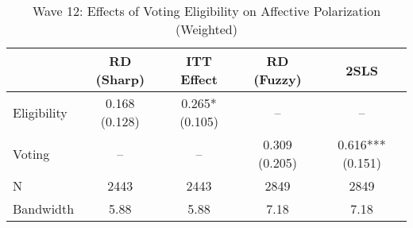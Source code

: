 \begin{table}[htbp]
\centering
\caption{Wave 12: Effects of Voting Eligibility on Affective Polarization (Weighted)}
\label{tab:wave12_w}
\begin{tabular}{lcccc}
\hline
 & RD (Sharp) & ITT Effect & RD (Fuzzy) & 2SLS \\
\hline
Eligibility & 0.168 (0.128) & 0.265* (0.105) & -- & -- \\
Voting & -- & -- & 0.309 (0.205) & 0.616*** (0.151) \\
\hline
N & 2443 & 2443 & 2849 & 2849 \\
Bandwidth & 5.88 & 5.88 & 7.18 & 7.18 \\
\hline
\end{tabular}
\end{table}

